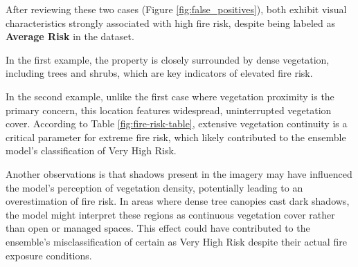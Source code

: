 After reviewing these two cases (Figure \ref{fig:false_positives}), both exhibit visual characteristics 
strongly associated with high fire risk, despite being labeled as \textbf{Average Risk} in the dataset.

In the first example, the property is closely surrounded by dense vegetation, including trees and 
shrubs, which are key indicators of elevated fire risk. 

In the second example, unlike the first case where vegetation proximity is the primary concern, 
this location features widespread, uninterrupted vegetation cover. According to Table \ref{fig:fire-risk-table}, 
extensive vegetation continuity is a critical parameter for extreme fire risk, which likely contributed 
to the ensemble model's classification of Very High Risk.

Another observations is that shadows present in the imagery may have influenced the model's perception of 
vegetation density, potentially leading to an overestimation of fire risk. In areas where dense tree 
canopies cast dark shadows, the model might interpret these regions as continuous vegetation cover rather 
than open or managed spaces. This effect could have contributed to the ensemble's misclassification of certain 
as Very High Risk despite their actual fire exposure conditions.
